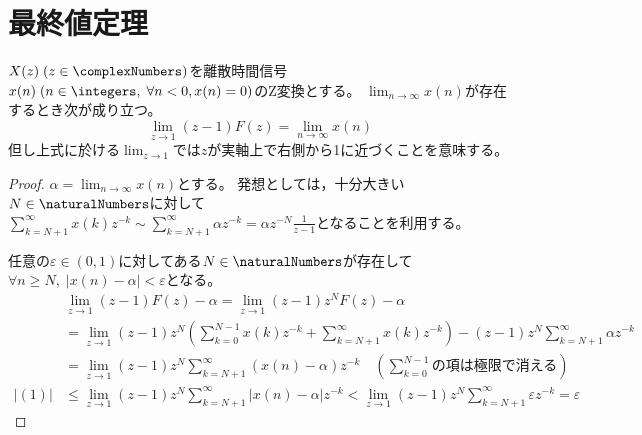 		\section{最終値定理}
			\begin{shadebox}
				$X(z)\;(z\in\complexNumbers)$を離散時間信号$x(n)\;(n \in \integers,\;\forall n<0,x(n)=0)$のZ変換とする。
				$\lim_{n\to\infty} x(n)$が存在するとき次が成り立つ。
				\[ \lim_{z\to1}(z-1)F(z) = \lim_{n\to\infty} x(n) \]
				但し上式に於ける$\lim_{z\to1}$では$z$が実軸上で右側から1に近づくことを意味する。
			\end{shadebox}
			\begin{proof}
				\quad\par
				$\alpha = \lim_{n\to\infty} x(n)$とする。
				発想としては，十分大きい$N\in\naturalNumbers$に対して$\sum_{k=N+1}^\infty x(k)z^{-k} \sim \sum_{k=N+1}^\infty \alpha z^{-k} = \alpha z^{-N}\frac{1}{z-1}$となることを利用する。
				\par
				任意の$\varepsilon \in (0,1)$に対してある$N\in\naturalNumbers$が存在して$\forall n\geq N,\;|x(n)-\alpha|<\varepsilon$となる。
				\begin{align*}
					\quad &\lim_{z\to1}(z-1)F(z) - \alpha = \lim_{z\to1}(z-1)z^N F(z) - \alpha \\
					&= \lim_{z\to1}(z-1)z^N\left(\sum_{k=0}^{N-1} x(k)z^{-k} + \sum_{k=N+1}^\infty x(k)z^{-k}\right) - (z-1)z^N\sum_{k=N+1}^\infty \alpha z^{-k} \\
					&= \lim_{z\to1}(z-1)z^N \sum_{k=N+1}^\infty (x(n) - \alpha)z^{-k} \quad \left(\sum_{k=0}^{N-1}\text{の項は極限で消える}\right) \tag{1} \\
					|(1)| &\leq \lim_{z\to1}(z-1)z^N \sum_{k=N+1}^\infty |x(n) - \alpha|z^{-k} < \lim_{z\to1}(z-1)z^N \sum_{k=N+1}^\infty \varepsilon z^{-k} = \varepsilon
				\end{align*}
			\end{proof}
